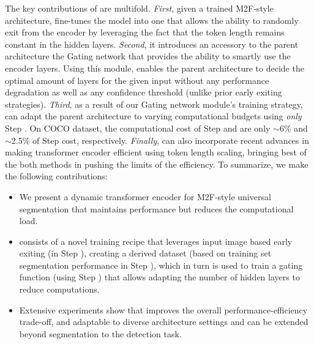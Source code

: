 The key contributions of \ours are multifold. \textit{First}, given a trained M2F-style architecture, \ours fine-tunes the model into one that allows the ability to randomly exit from the encoder by leveraging the fact that the token length remains constant in the hidden layers. \textit{Second}, it introduces an accessory to the parent architecture \via the Gating network that provides the ability to smartly use the encoder layers. Using this module, \ours enables the parent architecture to  decide the optimal amount of layers for the given input without any performance degradation as well as any confidence threshold (unlike prior early exiting strategies). \textit{Third}, as a result of our Gating network module's training strategy, \ours can adapt the parent architecture to varying computational budgets using \textit{only} Step \stepC. On COCO \cite{lin2014microsoft} dataset, the computational cost of Step \stepB and \stepC are only $\sim$6\% and $\sim$2.5\% of Step \stepA cost, respectively. \textit{Finally}, \ours can also incorporate recent advances \cite{li2023lite} in making transformer encoder efficient using token length scaling, bringing best of the both methods in pushing the limits of the efficiency. To summarize, we make the following contributions: 
\begin{itemize}[topsep=0.0em,leftmargin=*]
\setlength\itemsep{0.0em}
    \item We present a dynamic transformer encoder {\ours} for M2F-style universal segmentation that maintains performance but reduces the computational load.
    \item {\ours} consists of a novel training recipe that leverages input image based early exiting (in Step \stepA), creating a derived dataset (based on training set segmentation performance in Step \stepB), which in turn is used to train a gating function (using Step \stepC) that allows adapting the number of hidden layers to reduce computations.
    \item Extensive experiments show that {\ours} improves the overall performance-efficiency trade-off, and adaptable to diverse architecture settings and can be extended beyond segmentation to the detection task.
\end{itemize}